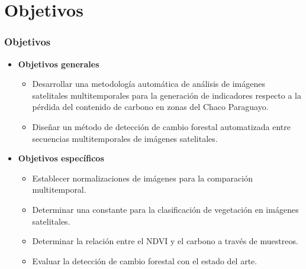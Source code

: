 \documentclass[xcolor=table]{beamer}
\begin{document}
		\section{Objetivos}
		\begin{frame}
			\frametitle{Objetivos}		
			\begin{itemize}
				\item \textbf{Objetivos generales}
				\begin{itemize}
					\item Desarrollar una metodolog\'ia autom\'atica de an\'alisis de im\'agenes satelitales multitemporales para la generaci\'on de indicadores respecto a la p\'erdida del contenido de carbono en zonas del Chaco Paraguayo.
					\item Dise\~{n}ar un m\'etodo de detecci\'on de cambio forestal automatizada entre secuencias multitemporales de im\'agenes satelitales. 
				\end{itemize}
				\item \textbf{Objetivos espec\'ificos}
				\begin{itemize}
					\item Establecer normalizaciones de im\'agenes para la comparaci\'on multitemporal. 
					\item Determinar una constante para la clasificaci\'on de vegetaci\'on en im\'agenes satelitales.
					\item Determinar la relaci\'on entre el NDVI y el carbono a trav\'es de muestreos.
					\item Evaluar la detecci\'on de cambio forestal con el estado del arte. 	
				\end{itemize}
				
			\end{itemize}
			
		\end{frame}
		
\end{document}
